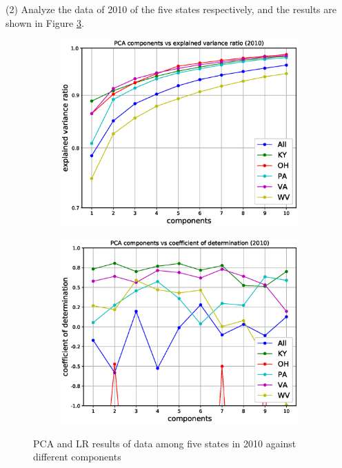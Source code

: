 \documentclass{mcmthesis}
\begin{document}
(2) Analyze the data of 2010 of the five states respectively, and the results are shown in Figure \ref{fig:pca_state_2010}. 
    \begin{figure}[H]
    \centering
    \begin{subfigure}[b]{0.48\textwidth}
        \includegraphics[width=\textwidth]{../figure/pca_state_2010_ratio.eps}
        \label{fig:pca_state_2010_ratio}
    \end{subfigure}\hfill
    \begin{subfigure}[b]{0.48\textwidth}
        \includegraphics[width=\textwidth]{../figure/pca_state_2010_score.eps}
        \label{fig:pca_state_2010_score}
    \end{subfigure}
    \caption{PCA and LR results of data among five states in 2010 against different components}\label{fig:pca_state_2010}
\end{figure}
\end{document}
